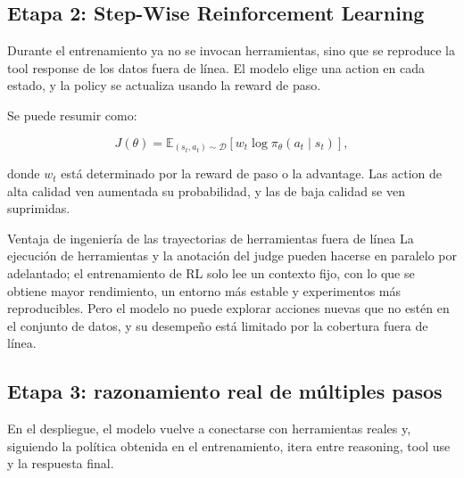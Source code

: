\subsection{Etapa 2: Step-Wise Reinforcement Learning}

Durante el entrenamiento ya no se invocan herramientas, sino que se reproduce la tool response de los datos fuera de línea. El modelo elige una action en cada estado, y la policy se actualiza usando la reward de paso.



Se puede resumir como:

$$
J(\theta)=\mathbb E_{(s_t,a_t)\sim\mathcal D}
\left[w_t\log\pi_\theta(a_t\mid s_t)\right],
$$

donde $w_t$ está determinado por la reward de paso o la advantage. Las action de alta calidad ven aumentada su probabilidad, y las de baja calidad se ven suprimidas.

\begin{knowledgebox}{Ventaja de ingeniería de las trayectorias de herramientas fuera de línea}
La ejecución de herramientas y la anotación del judge pueden hacerse en paralelo por adelantado; el entrenamiento de RL solo lee un contexto fijo, con lo que se obtiene mayor rendimiento, un entorno más estable y experimentos más reproducibles. Pero el modelo no puede explorar acciones nuevas que no estén en el conjunto de datos, y su desempeño está limitado por la cobertura fuera de línea.
\end{knowledgebox}

\subsection{Etapa 3: razonamiento real de múltiples pasos}

En el despliegue, el modelo vuelve a conectarse con herramientas reales y, siguiendo la política obtenida en el entrenamiento, itera entre reasoning, tool use y la respuesta final.


